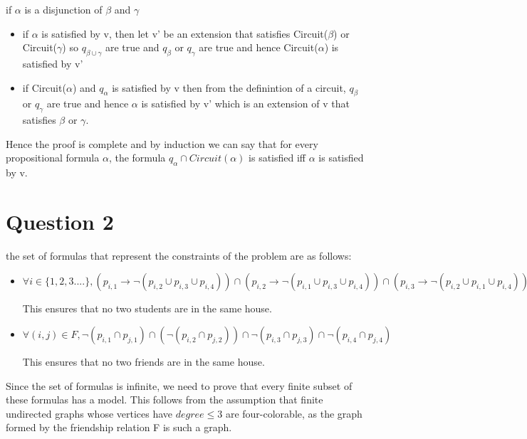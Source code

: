 \documentclass{article}
\begin{document}
if $\alpha$ is a disjunction of $\beta$ and $\gamma$

\begin{itemize}
    \item if $\alpha$ is satisfied by v, then let v' be an extension that satisfies Circuit($\beta$) or Circuit($\gamma$) so $q_{\beta \cup \gamma}$ are true and $q_\beta$ or $q_\gamma$ are true and hence Circuit($\alpha$) is satisfied by v'
    \item if Circuit($\alpha$) and $q_{\alpha}$ is satisfied by v then from the definintion of a circuit, $q_{\beta}$ or $q_\gamma$ are true and hence $\alpha$ is satisfied by v' which is an extension of v that satisfies $\beta$ or $\gamma$.
\end{itemize}

Hence the proof is complete and by induction we can say that for every propositional formula $\alpha$,  the formula $q_{\alpha} \cap Circuit(\alpha)$ is satisfied iff $\alpha$ is satisfied by v.

\section{Question 2}

the set of formulas that represent the constraints of the problem are as follows:

\begin{itemize}
    \item $\forall i \in \{1,2,3. . . .\}, (p_{i,1} \rightarrow \neg (p_{i,2} \cup p_{i,3} \cup p_{i,4}) ) \cap (p_{i,2} \rightarrow \neg (p_{i,1} \cup p_{i,3} \cup p_{i,4}) ) \cap
    (p_{i,3} \rightarrow \neg (p_{i,2} \cup p_{i,1} \cup p_{i,4}) ) \cap (p_{i,4} \rightarrow \neg (p_{i,2} \cup p_{i,3} \cup p_{i,1}) )$ 

    This ensures that no two students are in the same house.

    \item $\forall (i,j) \in F, \neg(p_{i,1} \cap p_{j,1}) \cap (\neg(p_{i,2} \cap p_{j,2})) \cap \neg(p_{i,3} \cap p_{j,3}) \cap \neg(p_{i,4} \cap p_{j,4}) $
    
    This ensures that no two friends are in the same house.

\end{itemize}
Since the set of formulas is infinite, we need to prove that every finite subset of these formulas has a model. This follows from the assumption that finite undirected graphs whose vertices have $degree \le 3$ are four-colorable, as the graph formed by the friendship relation F is such a graph.
\end{document}
